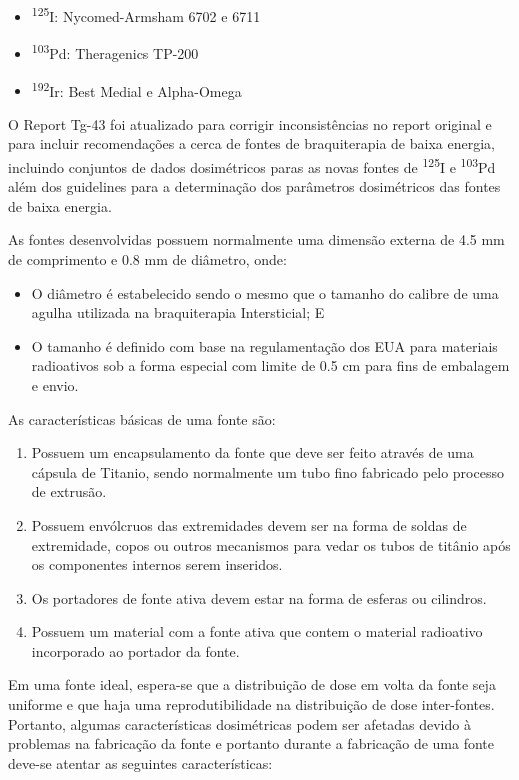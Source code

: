 \documentclass[11pt,a4paper]{article}
\begin{document}
				\begin{itemize}
					\item \textsuperscript{125}I: Nycomed-Armsham 6702 e 6711
					\item \textsuperscript{103}Pd: Theragenics TP-200
					\item  \textsuperscript{192}Ir: Best Medial e Alpha-Omega
				\end{itemize}
			
			O Report Tg-43 foi atualizado para corrigir inconsistências no report original e para incluir recomendações a cerca de fontes de braquiterapia de baixa energia, incluindo conjuntos de dados dosimétricos paras as novas fontes de \textsuperscript{125}I e \textsuperscript{103}Pd além dos guidelines para a determinação dos parâmetros dosimétricos das fontes de baixa energia.


			As fontes desenvolvidas possuem normalmente uma dimensão externa de 4.5 mm de comprimento e 0.8 mm de diâmetro, onde:

				\begin{itemize}
					\item O diâmetro é estabelecido sendo o mesmo que o tamanho do calibre de uma agulha utilizada na braquiterapia Intersticial; E
					\item O tamanho é definido com base na regulamentação dos EUA para materiais radioativos sob a forma especial com limite de 0.5 cm para fins de embalagem e envio.
				\end{itemize}

				As características básicas de uma fonte são:

				\begin{enumerate}
					\item   Possuem um encapsulamento da fonte que deve ser feito através de uma cápsula de Titanio, sendo normalmente um tubo fino fabricado pelo processo de extrusão.
					\item Possuem envólcruos das extremidades devem ser na forma de soldas de extremidade, copos ou outros mecanismos para vedar os tubos de titânio após os componentes internos serem inseridos.
					\item Os portadores de fonte ativa devem estar na forma de esferas ou cilindros.
					\item Possuem um material com a fonte ativa que contem o material radioativo incorporado ao portador da fonte.
				\end{enumerate}


			Em uma fonte ideal, espera-se que a distribuição de dose em volta da fonte seja uniforme e que haja uma reprodutibilidade na distribuição de dose inter-fontes. Portanto, algumas características dosimétricas podem ser afetadas devido à problemas na fabricação da fonte e portanto durante a fabricação de uma fonte deve-se atentar as seguintes características:
\end{document}
